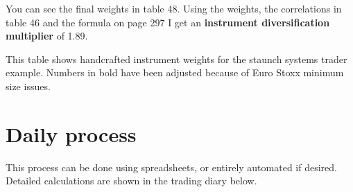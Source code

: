 You can see the final weights in table 48. Using the weights, the correlations in table 46 and the formula on page 297 I get an \textbf{instrument diversification multiplier} of 1.89.

 

This table shows handcrafted instrument weights for the staunch systems trader example. Numbers in bold have been adjusted because of Euro Stoxx minimum size issues.

\section*{Daily process}  {}

This process can be done using spreadsheets, or entirely automated if desired. Detailed calculations are shown in the trading diary below.

